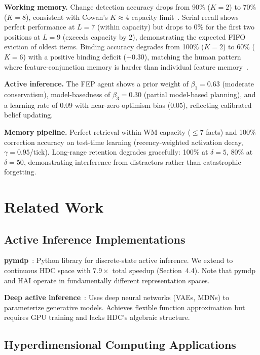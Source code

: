 \documentclass[10pt,letterpaper]{article}
\begin{document}
\textbf{Working memory.} Change detection accuracy drops from 90\% ($K{=}2$) to 70\% ($K{=}8$), consistent with Cowan's $K \approx 4$ capacity limit~\cite{cowan2001magical}.  Serial recall shows perfect performance at $L{=}7$ (within capacity) but drops to 0\% for the first two positions at $L{=}9$ (exceeds capacity by 2), demonstrating the expected FIFO eviction of oldest items.  Binding accuracy degrades from 100\% ($K{=}2$) to 60\% ($K{=}6$) with a positive binding deficit ($+0.30$), matching the human pattern where feature-conjunction memory is harder than individual feature memory~\cite{wheeler2002binding}.

\textbf{Active inference.} The FEP agent shows a prior weight of $\beta_1 = 0.63$ (moderate conservatism), model-basedness of $\beta_3 = 0.30$ (partial model-based planning), and a learning rate of 0.09 with near-zero optimism bias ($0.05$), reflecting calibrated belief updating.

\textbf{Memory pipeline.} Perfect retrieval within WM capacity ($\leq 7$ facts) and 100\% correction accuracy on test-time learning (recency-weighted activation decay, $\gamma = 0.95$/tick).  Long-range retention degrades gracefully: 100\% at $\delta{=}5$, 80\% at $\delta{=}50$, demonstrating interference from distractors rather than catastrophic forgetting.

\section{Related Work}

\subsection{Active Inference Implementations}

\textbf{pymdp}~\cite{heins2022pymdp}: Python library for discrete-state active inference. We extend to continuous HDC space with $7.9\times$ total speedup (Section~4.4). Note that pymdp and HAI operate in fundamentally different representation spaces.

\textbf{Deep active inference}~\cite{fountas2020deep,catal2020learning}: Uses deep neural networks (VAEs, MDNs) to parameterize generative models. Achieves flexible function approximation but requires GPU training and lacks HDC's algebraic structure.

\subsection{Hyperdimensional Computing Applications}
\end{document}
